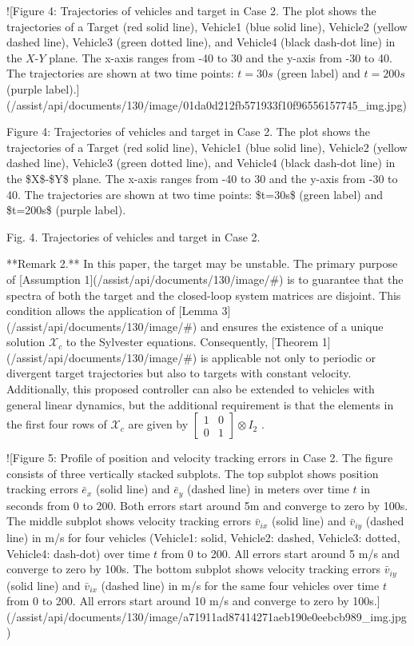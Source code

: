 ![Figure 4: Trajectories of vehicles and target in Case 2. The plot shows the trajectories of a Target (red solid line), Vehicle1 (blue solid line), Vehicle2 (yellow dashed line), Vehicle3 (green dotted line), and Vehicle4 (black dash-dot line) in the $X$-$Y$ plane. The x-axis ranges from -40 to 30 and the y-axis from -30 to 40. The trajectories are shown at two time points: $t=30s$ (green label) and $t=200s$ (purple label).](/assist/api/documents/130/image/01da0d212fb571933f10f96556157745_img.jpg)

Figure 4: Trajectories of vehicles and target in Case 2. The plot shows the trajectories of a Target (red solid line), Vehicle1 (blue solid line), Vehicle2 (yellow dashed line), Vehicle3 (green dotted line), and Vehicle4 (black dash-dot line) in the \$X\$-\$Y\$ plane. The x-axis ranges from -40 to 30 and the y-axis from -30 to 40. The trajectories are shown at two time points: \$t=30s\$ (green label) and \$t=200s\$ (purple label).

Fig. 4. Trajectories of vehicles and target in Case 2.

**Remark 2.** In this paper, the target may be unstable. The primary purpose of [Assumption 1](/assist/api/documents/130/image/#) is to guarantee that the spectra of both the target and the closed-loop system matrices are disjoint. This condition allows the application of [Lemma 3](/assist/api/documents/130/image/#) and ensures the existence of a unique solution  $\mathcal{X}_c$  to the Sylvester equations. Consequently, [Theorem 1](/assist/api/documents/130/image/#) is applicable not only to periodic or divergent target trajectories but also to targets with constant velocity. Additionally, this proposed controller can also be extended to vehicles with general linear dynamics, but the additional requirement is that the elements in the first four rows of  $\mathcal{X}_c$  are given by  $\begin{bmatrix} 1 & 0 \\ 0 & 1 \end{bmatrix} \otimes I_2$ .

![Figure 5: Profile of position and velocity tracking errors in Case 2. The figure consists of three vertically stacked subplots. The top subplot shows position tracking errors $\bar{e}_x$ (solid line) and $\bar{e}_y$ (dashed line) in meters over time $t$ in seconds from 0 to 200. Both errors start around 5m and converge to zero by 100s. The middle subplot shows velocity tracking errors $\bar{v}_{ix}$ (solid line) and $\bar{v}_{iy}$ (dashed line) in m/s for four vehicles (Vehicle1: solid, Vehicle2: dashed, Vehicle3: dotted, Vehicle4: dash-dot) over time $t$ from 0 to 200. All errors start around 5 m/s and converge to zero by 100s. The bottom subplot shows velocity tracking errors $\bar{v}_{iy}$ (solid line) and $\bar{v}_{ix}$ (dashed line) in m/s for the same four vehicles over time $t$ from 0 to 200. All errors start around 10 m/s and converge to zero by 100s.](/assist/api/documents/130/image/a71911ad87414271aeb190e0eebcb989_img.jpg)

